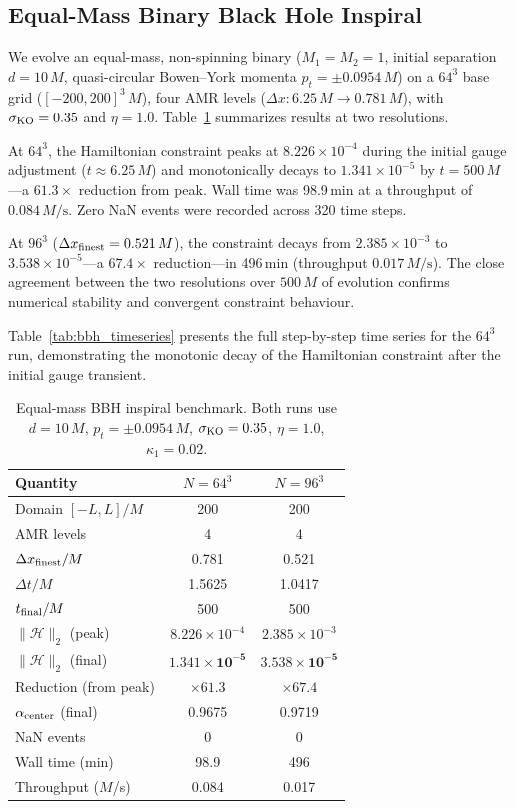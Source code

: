 \documentclass[aps,prd,twocolumn,superscriptaddress,nofootinbib,showpacs,
               longbibliography]{revtex4-2}
\newcommand{\norm}[1]{\|#1\|}
\begin{document}
\subsection{Equal-Mass Binary Black Hole Inspiral}
\label{sec:bbh_bench}

We evolve an equal-mass, non-spinning binary ($M_1 = M_2 = 1$, initial
separation $d = 10\,M$, quasi-circular Bowen--York momenta
$p_t = \pm 0.0954\,M$) on a $64^3$ base grid ($[-200, 200]^3\,M$), four
AMR levels ($\Delta x: 6.25\,M \to 0.781\,M$), with $\sigma_{\rm KO} = 0.35$
and $\eta = 1.0$.
Table~\ref{tab:bbh} summarizes results at two resolutions.

At $64^3$, the Hamiltonian constraint peaks at $8.226\times10^{-4}$ during
the initial gauge adjustment ($t \approx 6.25\,M$) and monotonically decays
to $1.341\times10^{-5}$ by $t = 500\,M$---a $\mathbf{61.3\times}$ reduction
from peak.
Wall time was 98.9\,min at a throughput of $0.084\,M/\text{s}$.
Zero NaN events were recorded across 320 time steps.

At $96^3$ ($\Delta x_{\rm finest} = 0.521\,M$), the constraint decays from
$2.385\times10^{-3}$ to $3.538\times10^{-5}$---a $67.4\times$ reduction---in
496\,min (throughput $0.017\,M/\text{s}$).
The close agreement between the two resolutions over $500\,M$ of evolution
confirms numerical stability and convergent constraint behaviour.

Table~\ref{tab:bbh_timeseries} presents the full step-by-step time series
for the $64^3$ run, demonstrating the monotonic decay of the Hamiltonian
constraint after the initial gauge transient.

\begin{table}[t]
\caption{Equal-mass BBH inspiral benchmark. Both runs use
  $d = 10\,M$, $p_t = \pm 0.0954\,M$, $\sigma_{\rm KO} = 0.35$,
  $\eta = 1.0$, $\kappa_1 = 0.02$.}
\label{tab:bbh}
\begin{ruledtabular}
\begin{tabular}{lcc}
  Quantity & $N = 64^3$ & $N = 96^3$ \\ \hline
  Domain $[-L, L]/M$ & 200 & 200 \\
  AMR levels & 4 & 4 \\
  $\Delta x_{\rm finest}/M$ & 0.781 & 0.521 \\
  $\Delta t/M$ & 1.5625 & 1.0417 \\
  $t_{\rm final}/M$ & 500 & 500 \\
  $\norm{\mathcal{H}}_2$ (peak) & $8.226\times10^{-4}$ & $2.385\times10^{-3}$ \\
  $\norm{\mathcal{H}}_2$ (final) & $\mathbf{1.341\times10^{-5}}$ & $\mathbf{3.538\times10^{-5}}$ \\
  Reduction (from peak) & $\times61.3$ & $\times67.4$ \\
  $\alpha_{\rm center}$ (final) & 0.9675 & 0.9719 \\
  NaN events & 0 & 0 \\
  Wall time (min) & 98.9 & 496 \\
  Throughput ($M$/s) & 0.084 & 0.017 \\
\end{tabular}
\end{ruledtabular}
\end{table}
\end{document}
